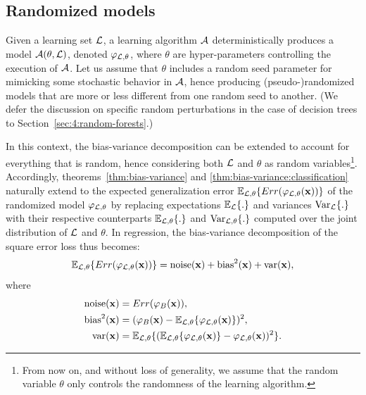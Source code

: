 \subsection{Randomized models}

Given a learning set ${\cal L}$, a learning algorithm ${\cal A}$
deterministically produces a model ${\cal A}(\theta, {\cal L})$, denoted
$\varphi_{{\cal L},\theta}$, where $\theta$ are hyper-parameters controlling
the execution of ${\cal A}$. Let us assume that $\theta$ includes a random seed
parameter for mimicking some stochastic behavior in ${\cal A}$, hence producing
(pseudo-)randomized models that are more or less different from one random seed
to another. (We defer the discussion on specific random perturbations in the
case of decision trees to Section~\ref{sec:4:random-forests}.)

In this context, the bias-variance decomposition can be extended to account for
everything that is random, hence considering both ${\cal L}$ and $\theta$ as
random variables\footnote{From now on, and without loss of generality, we
assume that the random variable $\theta$ only controls the randomness of the
learning algorithm.}.
Accordingly, theorems~\ref{thm:bias-variance} and \ref{thm:bias-variance:classification}
naturally extend to the expected generalization error
$\mathbb{E}_{{\cal L},\theta} \{ Err(\varphi_{{\cal L},\theta}(\mathbf{x})) \}$
of the randomized model $\varphi_{{\cal L},\theta}$ by replacing expectations
$\mathbb{E}_{\cal L} \{ . \}$ and variances $\text{Var}_{\cal L} \{ . \}$ with
their respective counterparts $\mathbb{E}_{{\cal L},\theta} \{ . \}$ and
$\text{Var}_{{\cal L},\theta} \{ . \}$ computed over the joint distribution of
${\cal L}$ and $\theta$. In regression, the bias-variance decomposition
of the square error loss thus becomes:
\begin{equation}
\mathbb{E}_{{\cal L},\theta} \{ Err(\varphi_{{\cal L},\theta}(\mathbf{x})) \} = \text{noise}(\mathbf{x}) + \text{bias}^2(\mathbf{x}) + \text{var}(\mathbf{x}),
\end{equation}
where
\begin{align}
\text{noise}(\mathbf{x}) &= Err(\varphi_B(\mathbf{x})), \\
\text{bias}^2(\mathbf{x}) &= (\varphi_B(\mathbf{x}) - \mathbb{E}_{{\cal L},\theta} \{ \varphi_{{\cal L},\theta}(\mathbf{x}) \} )^2, \\
\text{var}(\mathbf{x}) &= \mathbb{E}_{{\cal L},\theta} \{ (\mathbb{E}_{{\cal L},\theta} \{ \varphi_{{\cal L},\theta}(\mathbf{x}) \} - \varphi_{{\cal L},\theta}(\mathbf{x}))^2 \}.
\end{align}


